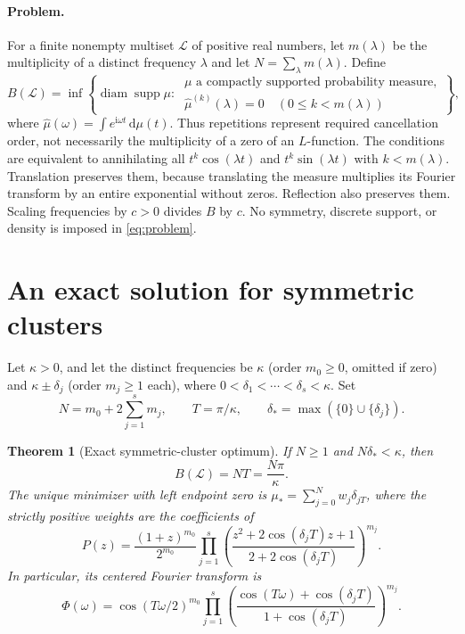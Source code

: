 \documentclass[11pt]{article}
\newtheorem{theorem}{Theorem}[section]
\theoremstyle{remark}\newtheorem{remark}[theorem]{Remark}
\newcommand{\supp}{\operatorname{supp}}
\newcommand{\diam}{\operatorname{diam}}
\newcommand{\dd}{\,\mathrm d}
\newcommand{\ii}{\mathrm i}
\begin{document}
\paragraph{Problem.} For a finite nonempty multiset $\mathcal L$ of positive real numbers, let $m(\lambda)$ be the multiplicity of a distinct frequency $\lambda$ and let $N=\sum_\lambda m(\lambda)$. Define
\begin{equation}\label{eq:problem}
 B(\mathcal L)=\inf\left\{\diam\supp\mu:\ \begin{array}{l}\mu\text{ a compactly supported probability measure},\\ \widehat\mu^{(k)}(\lambda)=0\quad(0\le k<m(\lambda))\end{array}\right\},
\end{equation}
where $\widehat\mu(\omega)=\int e^{\ii\omega t}\dd\mu(t)$. Thus repetitions represent required cancellation order, not necessarily the multiplicity of a zero of an $L$-function. The conditions are equivalent to annihilating all $t^k\cos(\lambda t)$ and $t^k\sin(\lambda t)$ with $k<m(\lambda)$. Translation preserves them, because translating the measure multiplies its Fourier transform by an entire exponential without zeros. Reflection also preserves them. Scaling frequencies by $c>0$ divides $B$ by $c$. No symmetry, discrete support, or density is imposed in \eqref{eq:problem}.

\section{An exact solution for symmetric clusters}
Let $\kappa>0$, and let the distinct frequencies be $\kappa$ (order $m_0\ge0$, omitted if zero) and $\kappa\pm\delta_j$ (order $m_j\ge1$ each), where $0<\delta_1<\cdots<\delta_s<\kappa$. Set
\[
 N=m_0+2\sum_{j=1}^s m_j,\qquad T=\pi/\kappa,\qquad \delta_* =\max(\{0\}\cup\{\delta_j\}).
\]
\begin{theorem}[Exact symmetric-cluster optimum]\label{thm:sym}
If $N\ge1$ and $N\delta_*<\kappa$, then
\[
 \boxed{B(\mathcal L)=NT=\frac{N\pi}{\kappa}}.
\]
The unique minimizer with left endpoint zero is $\mu_*=\sum_{j=0}^N w_j\delta_{jT}$, where the strictly positive weights are the coefficients of
\begin{equation}\label{eq:poly}
 P(z)=\frac{(1+z)^{m_0}}{2^{m_0}}
 \prod_{j=1}^s\left(\frac{z^2+2\cos(\delta_j T)z+1}{2+2\cos(\delta_j T)}\right)^{m_j}.
\end{equation}
In particular, its centered Fourier transform is
\begin{equation}\label{eq:transform}
 \Phi(\omega)=\cos(T\omega/2)^{m_0}\prod_{j=1}^s
 \left(\frac{\cos(T\omega)+\cos(\delta_j T)}{1+\cos(\delta_j T)}\right)^{m_j}.
\end{equation}
\end{theorem}
\end{document}
